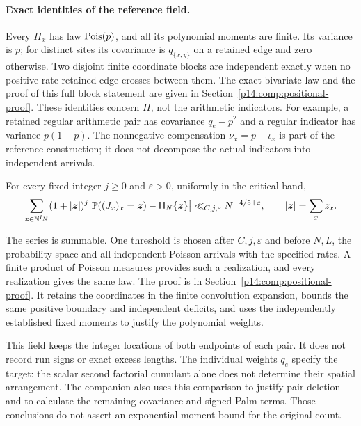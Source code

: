 \paragraph{Exact identities of the reference field.}
Every $H_x$ has law $\Pois(p)$, and all its polynomial moments are
finite. Its variance is $p$; for distinct sites its covariance is
$q_{\{x,y\}}$ on a retained edge and zero otherwise. Two disjoint
finite coordinate blocks are independent exactly when no positive-rate
retained edge crosses between them. The exact bivariate law and the
proof of this full block statement are given in
Section~\ref{p14:comp:positional-proof}.
These identities concern $H$, not the arithmetic indicators.
For example, a retained regular arithmetic pair has covariance $q_e-p^2$
and a regular indicator has variance $p(1-p)$.
The nonnegative compensation $\nu_x=p-\iota_x$ is part of the
reference construction; it does not decompose the actual indicators
into independent arrivals.

\begin{lemma}
\label{p1:limits:vector-reference}
For every fixed integer $j\ge0$ and $\varepsilon>0$, uniformly
in the critical band,
\begin{equation}
 \sum_{\boldsymbol z\in\mathbb N^{I_N}}
 (1+|\boldsymbol z|)^j
 \big|\P((J_x)_x=\boldsymbol z)-\mathsf H_N\{\boldsymbol z\}\big|
       \ll_{C,j,\varepsilon}N^{-4/5+\varepsilon},
 \qquad |\boldsymbol z|=\sum_xz_x.
 \label{p1:limits:vector-weighted}
\end{equation}
\end{lemma}

The series is summable. One threshold is chosen after $C,j,\varepsilon$
and before $N,L$, the probability space and all independent Poisson
arrivals with the specified rates. A finite product of Poisson measures
provides such a realization, and every realization gives the same law.
The proof is in Section~\ref{p14:comp:positional-proof}. It retains the
coordinates in the finite convolution expansion, bounds the same positive
boundary and independent deficits, and uses the independently established
fixed moments to justify the polynomial weights.

This field keeps the integer locations of both endpoints of each pair.
It does not record run signs or exact excess lengths. The individual
weights $q_e$ specify the target: the scalar second factorial cumulant
alone does not determine their spatial arrangement. The companion also
uses this comparison to justify pair deletion and to calculate the
remaining covariance and signed Palm terms. Those conclusions do not
assert an exponential-moment bound for the original count.
